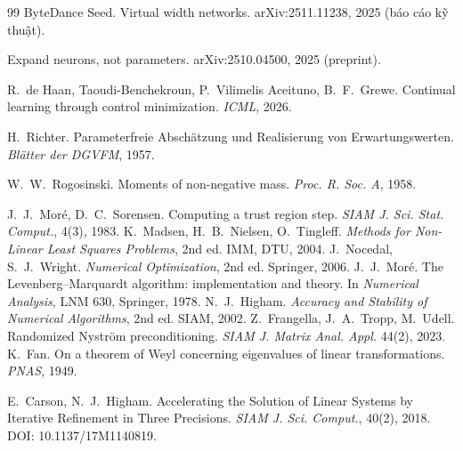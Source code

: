 \begin{thebibliography}{99}
 ByteDance Seed. Virtual width networks. arXiv:2511.11238, 2025 (báo cáo kỹ thuật).

 Expand neurons, not parameters. arXiv:2510.04500, 2025 (preprint).

 R.~de Haan, Taoudi-Benchekroun, P.~Vilimelis Aceituno, B.~F.~Grewe. Continual learning through control minimization. \emph{ICML}, 2026.

 H.~Richter. Parameterfreie Abschätzung und Realisierung von Erwartungswerten. \emph{Blätter der DGVFM}, 1957.\unv

 W.~W.~Rogosinski. Moments of non-negative mass. \emph{Proc. R. Soc. A}, 1958.\unv

 J.~J.~Moré, D.~C.~Sorensen. Computing a trust region step. \emph{SIAM J. Sci. Stat. Comput.}, 4(3), 1983.
 K.~Madsen, H.~B.~Nielsen, O.~Tingleff. \emph{Methods for Non-Linear Least Squares Problems}, 2nd ed. IMM, DTU, 2004.
 J.~Nocedal, S.~J.~Wright. \emph{Numerical Optimization}, 2nd ed. Springer, 2006.
 J.~J.~Moré. The Levenberg--Marquardt algorithm: implementation and theory. In \emph{Numerical Analysis}, LNM 630, Springer, 1978.
 N.~J.~Higham. \emph{Accuracy and Stability of Numerical Algorithms}, 2nd ed. SIAM, 2002.
 Z.~Frangella, J.~A.~Tropp, M.~Udell. Randomized Nyström preconditioning. \emph{SIAM J. Matrix Anal. Appl.} 44(2), 2023.
 K.~Fan. On a theorem of Weyl concerning eigenvalues of linear transformations. \emph{PNAS}, 1949.\unv

 E.~Carson, N.~J.~Higham.
Accelerating the Solution of Linear Systems by Iterative Refinement in Three Precisions.
\emph{SIAM J. Sci. Comput.}, 40(2), 2018. DOI: 10.1137/17M1140819.

\end{thebibliography}
